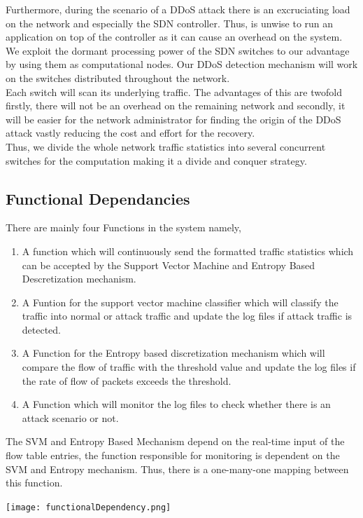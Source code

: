 \documentclass[12pt,a4paper,final]{report}
\DeclareRobustCommand{\gobblefive}[5]{}
\newcommand*{\SkipTocEntry}{\addtocontents{toc}{\gobblefive}}
\begin{document}
	Furthermore, during the scenario of a DDoS attack there is an excruciating load on the network and especially the SDN controller.	Thus, is unwise to run an application on top of the controller as it can cause an overhead on the system. We exploit the dormant processing power of the SDN switches to our advantage by using them as computational nodes. Our DDoS detection mechanism will work on the switches distributed throughout the network. \\

Each switch will scan its underlying traffic. The advantages of this are twofold firstly, there will not be an overhead on the remaining network and secondly, it will be easier for the network administrator for finding the origin of the DDoS attack vastly reducing the cost and effort for the recovery. \\

Thus, we divide the whole network traffic statistics into several concurrent switches for the computation making it a divide and conquer strategy.

\SkipTocEntry\subsection{Functional Dependancies}
There are mainly four Functions in the system namely,
\begin{enumerate}
\item
A function which will continuously send the formatted traffic statistics which can be accepted by the Support Vector Machine and Entropy Based Descretization mechanism.
\item
A Funtion for the support vector machine classifier which will classify the traffic into normal or attack traffic and update the log files if attack traffic is detected.
\item
A Function for the Entropy based discretization mechanism which will compare the flow of traffic with the threshold value and update the log files if the rate of flow of packets exceeds the threshold.
\item
A Function which will monitor the log files to check whether there is an attack scenario or not.
\end{enumerate}
The SVM and Entropy Based Mechanism depend on the real-time input of the flow table entries, the function responsible for monitoring is dependent on the SVM and Entropy mechanism. Thus, there is a one-many-one mapping between this function.
\begin{center}
\texttt{[image: functionalDependency.png]}
\end{center}
\newpage
\end{document}

